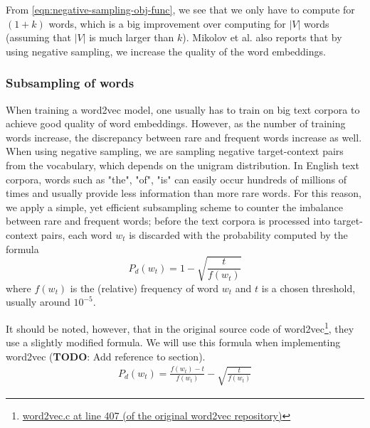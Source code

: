 From \cref{eqn:negative-sampling-obj-func}, we see that we only have to compute for $(1 + k)$ words, which is a big improvement over computing for $|V|$ words (assuming that $|V|$ is much larger than $k$). Mikolov et al. also reports that by using negative sampling, we increase the quality of the word embeddings.

\subsubsection{Subsampling of words}
When training a word2vec model, one usually has to train on big text corpora to achieve good quality of word embeddings. However, as the number of training words increase, the discrepancy between rare and frequent words increase as well. When using negative sampling, we are sampling negative target-context pairs from the vocabulary, which depends on the unigram distribution. In English text corpora, words such as "the", "of", "is" can easily occur hundreds of millions of times and usually provide less information than more rare words. For this reason, we apply a simple, yet efficient subsampling scheme to counter the imbalance between rare and frequent words; before the text corpora is processed into target-context pairs, each word $w_t$ is discarded with the probability computed by the formula \cite{mikolov2013b, levy-etal-2015-improving}
\begin{equation}
    P_d(w_t) = 1 - \sqrt{\frac{t}{f(w_t)}}
\end{equation}
where $f(w_t)$ is the (relative) frequency of word $w_t$ and $t$ is a chosen threshold, usually around $10^{-5}$.

It should be noted, however, that in the original source code of word2vec\footnote{\href{https://github.com/tmikolov/word2vec/blob/e092540633572b883e25b367938b0cca2cf3c0e7/word2vec.c\#L407}{word2vec.c at line 407 (of the original word2vec repository)}}, they use a slightly modified formula. We will use this formula when implementing word2vec (\textbf{TODO}: Add reference to section).
\begin{align}
    P_d(w_t) = \frac{f(w_t) - t}{f(w_t)} - \sqrt{\frac{t}{f(w_t)}}
\end{align}


